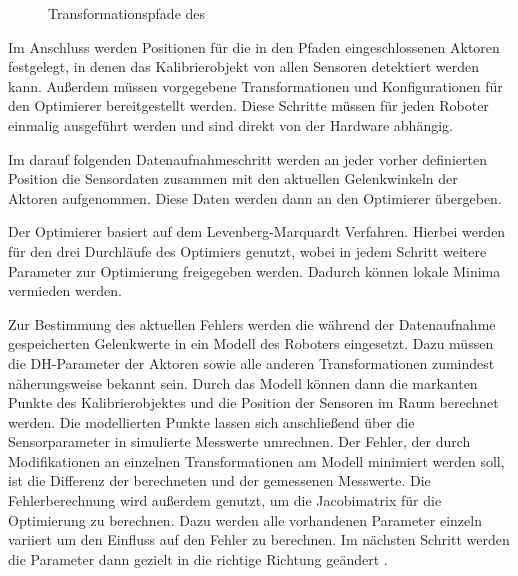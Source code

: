 \begin{figure}[Htbp] \centering {}
   \caption{Transformationspfade des \cob} \label{fig:pfade} \end{figure}

Im Anschluss werden Positionen für die in den Pfaden eingeschlossenen Aktoren
festgelegt, in denen das Kalibrierobjekt von allen Sensoren detektiert werden
kann. Außerdem müssen vorgegebene Transformationen und Konfigurationen für den
Optimierer bereitgestellt werden. Diese Schritte müssen für jeden Roboter
einmalig ausgeführt werden und sind direkt von der Hardware abhängig. 

Im darauf folgenden Datenaufnahmeschritt werden an jeder vorher definierten
Position die Sensordaten zusammen mit den aktuellen Gelenkwinkeln der Aktoren
aufgenommen. Diese Daten werden dann an den Optimierer übergeben.

Der Optimierer basiert auf dem Levenberg-Marquardt Verfahren.\cite[Abschnitt 1]{pr2_estimation}
Hierbei werden
für den \cob drei Durchläufe des Optimiers genutzt, wobei in jedem Schritt
weitere Parameter zur Optimierung freigegeben werden. Dadurch können lokale
Minima vermieden werden.

Zur Bestimmung des aktuellen Fehlers werden die während der Datenaufnahme
gespeicherten Gelenkwerte in ein Modell des Roboters eingesetzt. Dazu müssen
die \ac{DH-Parameter} der Aktoren sowie alle anderen Transformationen zumindest
näherungsweise bekannt sein. Durch das Modell können dann die markanten Punkte
des Kalibrierobjektes und die Position der Sensoren im Raum berechnet werden.
Die modellierten Punkte lassen sich anschließend über die Sensorparameter in
simulierte Messwerte umrechnen. Der Fehler, der durch Modifikationen an einzelnen
Transformationen am Modell minimiert werden soll, ist die Differenz der
berechneten und der gemessenen Messwerte.\cite{levi2012autonomous}
Die Fehlerberechnung wird außerdem genutzt, um die Jacobimatrix für die Optimierung zu berechnen. Dazu werden alle
vorhandenen Parameter einzeln variiert um den Einfluss auf den Fehler zu berechnen.
Im nächsten Schritt werden die Parameter dann gezielt in die richtige Richtung
geändert \cite{forsyth2011}.



